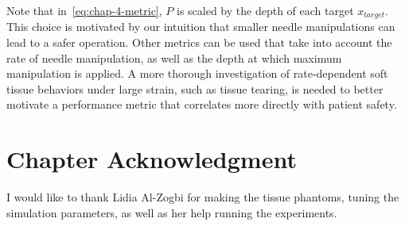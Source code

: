 Note that in~\cref{eq:chap-4-metric}, $P$ is scaled by the depth of each target $x_{target}$. This choice is motivated by our intuition that smaller needle manipulations can lead to a safer operation. Other metrics can be used that take into account the rate of needle manipulation, as well as the depth at which maximum manipulation is applied. A more thorough investigation of rate-dependent soft tissue behaviors under large strain, such as tissue tearing, is needed to better motivate a performance metric that correlates more directly with patient safety. 


\section{Chapter Acknowledgment}
\label{sec:chap-4-ack}

I would like to thank Lidia Al-Zogbi for making the tissue phantoms, tuning the simulation parameters, as well as her help running the experiments.

